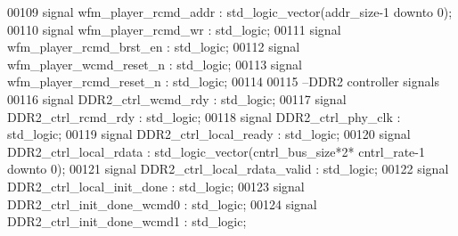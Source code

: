 \begin{DoxyCode}
00109 \textcolor{keywordflow}{signal} \textcolor{vhdlchar}{wfm_player_rcmd_addr}     \textcolor{vhdlchar}{:} \textcolor{comment}{std\_logic\_vector}\textcolor{vhdlchar}{(}\textcolor{vhdlchar}{addr_size}\textcolor{vhdlchar}{-}\textcolor{vhdllogic}{}\textcolor{vhdllogic}{1} \textcolor{keywordflow}{downto} \textcolor{vhdllogic}{}\textcolor{vhdllogic}{0}\textcolor{vhdlchar}{)};
00110 \textcolor{keywordflow}{signal} \textcolor{vhdlchar}{wfm_player_rcmd_wr}           \textcolor{vhdlchar}{:} \textcolor{comment}{std\_logic};
00111 \textcolor{keywordflow}{signal} \textcolor{vhdlchar}{wfm_player_rcmd_brst_en}  \textcolor{vhdlchar}{:} \textcolor{comment}{std\_logic};
00112 \textcolor{keywordflow}{signal} \textcolor{vhdlchar}{wfm_player_wcmd_reset_n}  \textcolor{vhdlchar}{:} \textcolor{comment}{std\_logic};
00113 \textcolor{keywordflow}{signal} \textcolor{vhdlchar}{wfm_player_rcmd_reset_n}  \textcolor{vhdlchar}{:} \textcolor{comment}{std\_logic};
00114 
00115 \textcolor{keyword}{--DDR2 controller signals}
00116 \textcolor{keywordflow}{signal} \textcolor{vhdlchar}{DDR2_ctrl_wcmd_rdy}               \textcolor{vhdlchar}{:} \textcolor{comment}{std\_logic};
00117 \textcolor{keywordflow}{signal} \textcolor{vhdlchar}{DDR2_ctrl_rcmd_rdy}               \textcolor{vhdlchar}{:} \textcolor{comment}{std\_logic};
00118 \textcolor{keywordflow}{signal} \textcolor{vhdlchar}{DDR2_ctrl_phy_clk}                \textcolor{vhdlchar}{:} \textcolor{comment}{std\_logic};
00119 \textcolor{keywordflow}{signal} \textcolor{vhdlchar}{DDR2_ctrl_local_ready}            \textcolor{vhdlchar}{:} \textcolor{comment}{std\_logic};
00120 \textcolor{keywordflow}{signal} \textcolor{vhdlchar}{DDR2_ctrl_local_rdata}            \textcolor{vhdlchar}{:} \textcolor{comment}{std\_logic\_vector}\textcolor{vhdlchar}{(}\textcolor{vhdlchar}{cntrl_bus_size}\textcolor{vhdlchar}{*}\textcolor{vhdllogic}{}\textcolor{vhdllogic}{2}\textcolor{vhdlchar}{*}\textcolor{vhdlchar}{
      cntrl_rate}\textcolor{vhdlchar}{-}\textcolor{vhdllogic}{}\textcolor{vhdllogic}{1} \textcolor{keywordflow}{downto} \textcolor{vhdllogic}{}\textcolor{vhdllogic}{0}\textcolor{vhdlchar}{)};
00121 \textcolor{keywordflow}{signal} \textcolor{vhdlchar}{DDR2_ctrl_local_rdata_valid}  \textcolor{vhdlchar}{:} \textcolor{comment}{std\_logic};
00122 \textcolor{keywordflow}{signal} \textcolor{vhdlchar}{DDR2_ctrl_local_init_done}        \textcolor{vhdlchar}{:} \textcolor{comment}{std\_logic};
00123 \textcolor{keywordflow}{signal} \textcolor{vhdlchar}{DDR2_ctrl_init_done_wcmd0}    \textcolor{vhdlchar}{:} \textcolor{comment}{std\_logic};
00124 \textcolor{keywordflow}{signal} \textcolor{vhdlchar}{DDR2_ctrl_init_done_wcmd1}    \textcolor{vhdlchar}{:} \textcolor{comment}{std\_logic};

\end{DoxyCode}
